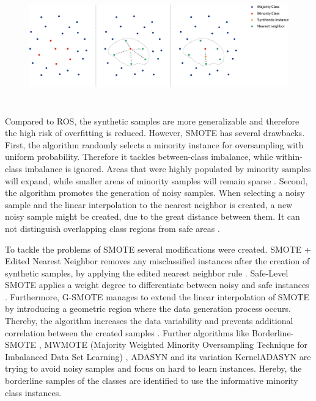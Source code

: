 \documentclass[parskip=full]{scrartcl}
\begin{document}
\begin{figure}[H]
	\centering
	\includegraphics[width=16.5cm, height=5cm, keepaspectratio]{./resources/fig1.png}
	\label{fig:Schubach}
\end{figure}

Compared to ROS, the synthetic samples are more generalizable and therefore the
high risk of overfitting is reduced. However, SMOTE has several drawbacks.
First, the algorithm randomly selects a minority instance for oversampling with
uniform probability. Therefore it tackles between-class imbalance, while
within-class imbalance is ignored. Areas that were highly populated by minority
samples will expand, while smaller areas of minority samples will remain sparse
\cite{Prati2004}. Second, the algorithm promotes the generation of noisy
samples. When selecting a noisy sample and the linear interpolation to the
nearest neighbor is created, a new noisy sample might be created, due to the
great distance between them. It can not distinguish overlapping class regions
from safe areas \cite{Bunkhumpornpat2009}. 

To tackle the problems of SMOTE several modifications were created. SMOTE +
Edited Nearest Neighbor removes any misclassified instances after the creation
of synthetic samples, by applying the edited nearest neighbor rule
\cite{Maria2004}. Safe-Level SMOTE applies a weight degree to differentiate
between noisy and safe instances \cite{Bunkhumpornpat2009}. Furthermore, G-SMOTE
manages to extend the linear interpolation of SMOTE by introducing a geometric
region where the data generation process occurs. Thereby, the algorithm
increases the data variability and prevents additional correlation between the
created samples \cite{Douzas2017}. Further algorithms like Borderline-SMOTE
\cite{Han2005}, MWMOTE (Majority Weighted Minority Oversampling Technique for
Imbalanced Data Set Learning) \cite{Barua2014}, ADASYN and its variation
KernelADASYN \cite{Tang2015} are trying to avoid noisy samples and focus on hard
to learn instances. Hereby, the borderline samples of the classes are identified
to use the informative minority class instances.
\end{document}
